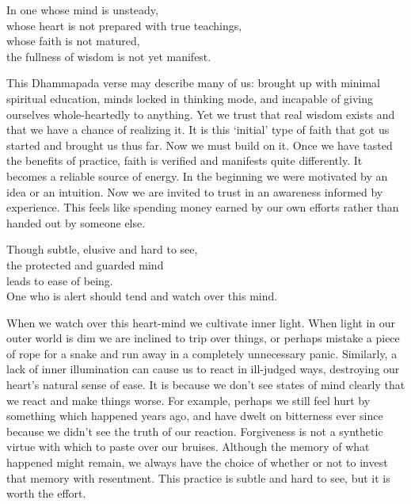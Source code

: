 \begin{dhpVerse}{38}
\label{dhp-38}
In one whose mind is unsteady,\\
whose heart is not prepared with true teachings,\\
whose faith is not matured,\\
the fullness of wisdom is not yet manifest.
\end{dhpVerse}

\begin{dhpRefl}
  This Dhammapada verse may describe many of us: brought up with \mbox{minimal}
  spiritual education, minds locked in thinking mode, and incapable of giving
  ourselves whole-heartedly to anything. Yet we trust that real wisdom exists
  and that we have a chance of realizing it. It is this ‘initial’ type of faith
  that got us started and brought us thus far. Now we must build on it. Once we
  have tasted the benefits of practice, faith is verified and manifests quite
  differently. It becomes a reliable source of energy. In the beginning we were
  motivated by an idea or an intuition. Now we are invited to trust in an
  awareness informed by experience. This feels like spending money earned by our
  own efforts rather than handed out by someone else.
\end{dhpRefl}


\begin{dhpVerse}{36}
\label{dhp-36}
Though subtle, elusive and hard to see,\\
the protected and guarded mind\\
leads to ease of being.\\
One who is alert should tend and watch over this mind.
\end{dhpVerse}

\begin{dhpRefl}
  When we watch over this heart-mind we cultivate inner light. When light in our
  outer world is dim we are inclined to trip over things, or perhaps mistake a
  piece of rope for a snake and run away in a completely unnecessary panic.
  Similarly, a lack of inner illumination can cause us to react in ill-judged
  ways, destroying our heart’s natural sense of ease. It is because we don’t see
  states of mind clearly that we react and make things worse. For example,
  perhaps we still feel hurt by something which happened years ago, and have
  dwelt on bitterness ever since because we didn’t see the truth of our
  reaction. Forgiveness is not a synthetic virtue with which to paste over our
  bruises. Although the memory of what happened might remain, we always have the
  choice of whether or not to invest that memory with resentment. This practice
  is subtle and hard to see, but it is worth the effort.
\end{dhpRefl}

